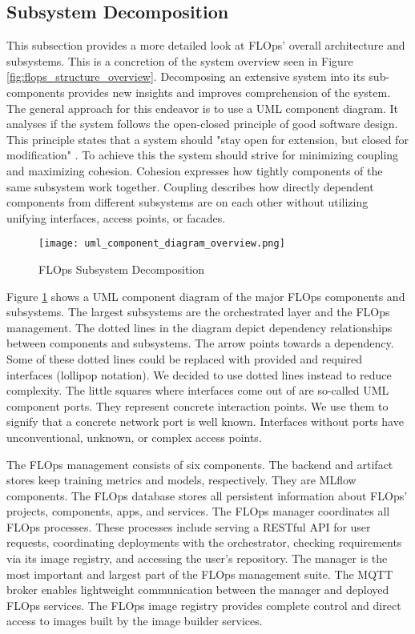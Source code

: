\subsection{Subsystem Decomposition}
This subsection provides a more detailed look at FLOps' overall architecture and subsystems.
This is a concretion of the system overview seen in Figure \ref{fig:flops_structure_overview}.
Decomposing an extensive system into its sub-components provides new insights and improves comprehension of the system.
The general approach for this endeavor is to use a UML component diagram.
It analyses if the system follows the open-closed principle of good software design.
This principle states that a system should "stay open for extension, but closed for modification" \cite{book:bruegge}.
To achieve this the system should strive for minimizing coupling and maximizing cohesion.
Cohesion expresses how tightly components of the same subsystem work together.
Coupling describes how directly dependent components from different subsystems are on each other without utilizing unifying interfaces, access points, or facades.

\begin{figure}[p]
    \begin{adjustwidth}{-0.175\paperwidth}{-0.175\paperwidth}
        \centering
        \texttt{[image: uml\_component\_diagram\_overview.png]}
        \caption{FLOps Subsystem Decomposition}
        \label{fig:component_diagram_overview}
    \end{adjustwidth}
\end{figure}

Figure \ref{fig:component_diagram_overview} shows a UML component diagram of the major FLOps components and subsystems.
The largest subsystems are the orchestrated layer and the FLOps management.
The dotted lines in the diagram depict dependency relationships between components and subsystems.
The arrow points towards a dependency.
Some of these dotted lines could be replaced with provided and required interfaces (lollipop notation).
We decided to use dotted lines instead to reduce complexity.
The little squares where interfaces come out of are so-called UML component ports.
They represent concrete interaction points.
We use them to signify that a concrete network port is well known.
Interfaces without ports have unconventional, unknown, or complex access points.

The FLOps management consists of six components.
The backend and artifact stores keep training metrics and models, respectively.
They are MLflow components.
The FLOps database stores all persistent information about FLOps' projects, components, apps, and services.
The FLOps manager coordinates all FLOps processes.
These processes include serving a RESTful API for user requests, coordinating deployments with the orchestrator, checking requirements via its image registry, and accessing the user's repository.
The manager is the most important and largest part of the FLOps management suite.
The MQTT broker enables lightweight communication between the manager and deployed FLOps services.
The FLOps image registry provides complete control and direct access to images built by the image builder services.

